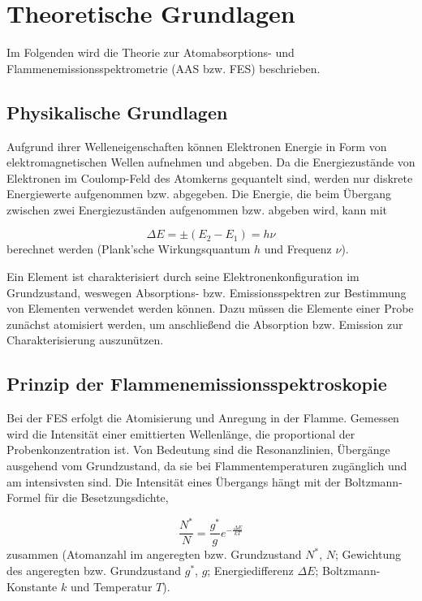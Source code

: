 \section{Theoretische Grundlagen}

  Im Folgenden wird die Theorie zur Atomabsorptions- und Flammenemissionsspektrometrie (AAS bzw. FES) beschrieben. 
  
  \subsection{Physikalische Grundlagen}
  
    Aufgrund ihrer Welleneigenschaften können Elektronen Energie in Form von elektromagnetischen Wellen aufnehmen und abgeben. Da die Energiezustände von Elektronen im Coulomp-Feld des Atomkerns gequantelt sind, werden nur diskrete Energiewerte aufgenommen bzw. abgegeben. Die Energie, die beim Übergang zwischen zwei Energiezuständen aufgenommen bzw. abgeben wird, kann mit
    
      \begin{equation}
        \Delta E = \pm \left(E_2 - E_1\right) = h \nu
      \end{equation}
    berechnet werden (Plank'sche Wirkungsquantum $h$ und Frequenz $\nu$). \citep[S. 100-102]{PhysikIII}
    
    Ein Element ist charakterisiert durch seine Elektronenkonfiguration im Grundzustand, weswegen Absorptions- bzw. Emissionsspektren zur  Bestimmung von Elementen verwendet werden können. Dazu müssen die Elemente einer Probe zunächst atomisiert werden, um anschließend die Absorption bzw. Emission zur Charakterisierung auszunützen. \citep[S. 82]{Taschenatlas}
  
  \subsection{Prinzip der Flammenemissionsspektroskopie}
    
    Bei der FES erfolgt die Atomisierung und Anregung in der Flamme. Gemessen wird die Intensität einer emittierten Wellenlänge, die proportional der Probenkonzentration ist. Von Bedeutung sind die Resonanzlinien, Übergänge ausgehend vom Grundzustand, da sie bei  Flammentemperaturen zugänglich und am intensivsten sind. Die Intensität eines Übergangs hängt mit der Boltzmann-Formel für die Besetzungsdichte,
    
      \begin{equation}
        \frac{N^*}{N} = \frac{g^*}{g} e^{-\frac{\Delta E}{kT}}
      \end{equation}
    zusammen (Atomanzahl im angeregten bzw. Grundzustand $N^*$, $N$; Gewichtung des angeregten bzw. Grundzustand $g^*$, $g$; Energiedifferenz $\Delta E$; Boltzmann-Konstante $k$ und Temperatur $T$). \citep{Versuchsvorschrift}
    
